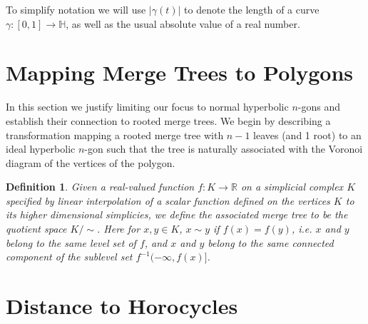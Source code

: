 \documentclass[10pt,a4paper]{article}
\newtheorem{definition}{Definition}
\newcommand{\len}[1]{\left\lvert #1 \right\rvert}
\begin{document}
To simplify notation we will use $\len{\gamma(t)}$ to denote the length of a curve $\gamma: [0,1] \rightarrow \mathbb{H}$, as well as the usual absolute value of a real number.

\section{Mapping Merge Trees to Polygons}
\label{sec:mapmerge2poly}
In this section we justify limiting our focus to normal hyperbolic $n$-gons and establish their connection to rooted merge trees. We begin by describing a transformation mapping a rooted merge tree with $n-1$ leaves (and 1 root) to an ideal hyperbolic $n$-gon such that the tree is naturally associated with the Voronoi diagram of the vertices of the polygon. 

\begin{definition}
Given a real-valued function $f:K \rightarrow \mathbb{R}$ on a simplicial complex $K$ specified by linear interpolation of a scalar function defined on the vertices $K$ to its higher dimensional simplicies, we define the associated merge tree to be the quotient space $K/\sim$. Here for $x,y \in K$, $x \sim y$ if $f(x) = f(y)$, i.e. $x$ and $y$ belong to the same level set of $f$, and $x$ and $y$ belong to the same connected component of the sublevel set $f^{-1}(-\infty, f(x)]$.
\end{definition}

















 \section{Distance to Horocycles}
 \label{sec:dist2horos}
\end{document}
